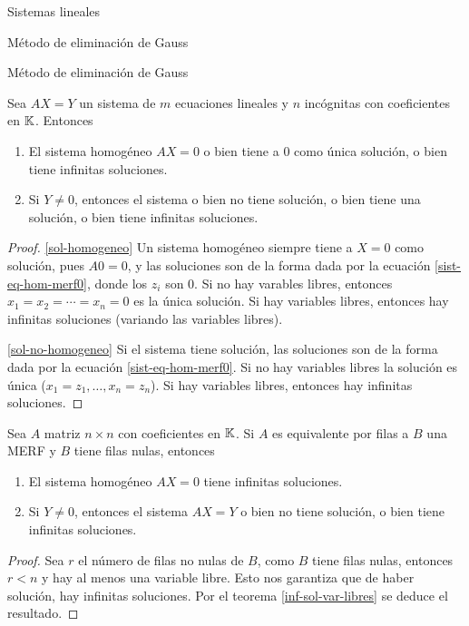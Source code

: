 \begin{chapter}{Sistemas lineales}
\begin{section}{Método de eliminación de Gauss }
\begin{subsection}{Método de eliminación de Gauss}
                \begin{teorema}\label{inf-sol-var-libres}
                    Sea $AX=Y$ un sistema de $m$ ecuaciones lineales y $n$ incógnitas con coeficientes en $\mathbb K$. Entonces
                    \begin{enumerate}
                        \item\label{sol-homogeneo} El sistema homogéneo $AX=0$ o bien tiene a $0$ como única solución,  o bien tiene infinitas soluciones. 
                        \item\label{sol-no-homogeneo} Si $Y \ne 0$,  entonces el sistema  o bien no tiene solución, o bien tiene una solución, o bien tiene infinitas soluciones. 
                    \end{enumerate} 
                \end{teorema}
                \begin{proof}
                    \ref{sol-homogeneo}  Un  sistema homogéneo siempre tiene a $X=0$ como solución, pues $A0 =0$, y  las soluciones son de la forma dada por la ecuación \eqref{sist-eq-hom-merf0}, donde los $z_i$ son $0$. Si  no hay varables libres, entonces $x_1=x_2= \cdots =x_n =0$ es la única solución. Si hay variables libres,  entonces hay infinitas soluciones (variando las variables libres).  
                    
                   \ref{sol-no-homogeneo} Si el  sistema tiene solución, las soluciones son de la forma dada por la ecuación \eqref{sist-eq-hom-merf0}. Si  no hay variables libres la solución es única ($x_1=z_1,\ldots,x_n =z_n$). Si hay variables libres,  entonces hay infinitas soluciones.   
                \end{proof}
                
                \begin{corolario}\label{inf-sol}
                    Sea $A$ matriz $n \times n$ con coeficientes en $\mathbb K$. Si $A$ es equivalente por filas a  $B$ una  MERF y $B$ tiene filas nulas, entonces
                    \begin{enumerate}
                        \item\label{sol-homogeneo-2} El sistema homogéneo $AX=0$ tiene  infinitas soluciones. 
                        \item\label{sol-no-homogeneo-2} Si $Y \ne 0$,  entonces el sistema  $AX =Y$ o bien no tiene solución, o bien tiene infinitas soluciones.
                    \end{enumerate} 
                \end{corolario}
                \begin{proof} Sea $r$  el número de filas no nulas de $B$, como $B$ tiene filas nulas,  entonces $r<n$ y  hay al menos una variable libre. Esto nos garantiza que de haber solución, hay infinitas soluciones. Por el teorema \ref{inf-sol-var-libres} se deduce el resultado. 
                \end{proof}
                

\end{subsection}
\end{section}
\end{chapter}
